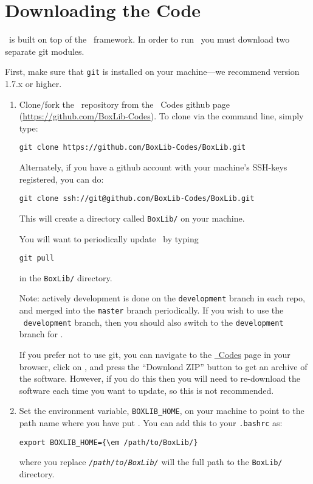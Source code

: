 
\section{Downloading the Code}

\castro\ is built on top of the \boxlib\ framework.  In order to run
\castro\, you must download two separate git modules.

\vspace{.1in}

\noindent First, make sure that {\tt git} is installed on your machine---we recommend version 1.7.x or higher.

\vspace{.1in}

\begin{enumerate}

\item Clone/fork the \boxlib\ repository from the \boxlib\ Codes {\sf
  github} page (\url{https://github.com/BoxLib-Codes}).  To
  clone via the command line, simply type:
\begin{verbatim}
git clone https://github.com/BoxLib-Codes/BoxLib.git
\end{verbatim}
Alternately, if you have a {\sf github} account with your
machine's SSH-keys registered, you can do:
\begin{verbatim}
git clone ssh://git@github.com/BoxLib-Codes/BoxLib.git
\end{verbatim}

This will create a directory called {\tt BoxLib/} on your machine.

You will want to periodically update \boxlib\ by typing
\begin{verbatim}
git pull
\end{verbatim}
in the {\tt BoxLib/} directory.  

Note: actively development is done on the {\tt development} branch
in each repo, and merged into the {\tt master} branch periodically.
If you wish to use the \castro\ {\tt development} branch, then you
should also switch to the {\tt development} branch for \boxlib.

If you prefer not to use {\sf git}, you can navigate to the
\href{https://github.com/BoxLib-Codes}{\boxlib\ Codes} page in
your browser, click on \boxlib, and press the ``Download ZIP''
button to get an archive of the software. However, if you do this
then you will need to re-download the software each time you want to
update, so this is not recommended.

\item Set the environment variable, {\tt BOXLIB\_HOME}, on your
  machine to point to the path name where you have put \boxlib.
  You can add this to your {\tt .bashrc} as:
\begin{Verbatim}[commandchars=\\\{\}]
export BOXLIB_HOME={\em /path/to/BoxLib/}
\end{Verbatim}
where you replace \texttt{\em /path/to/BoxLib/} will the full path to the
{\tt BoxLib/} directory.


\end{enumerate}
